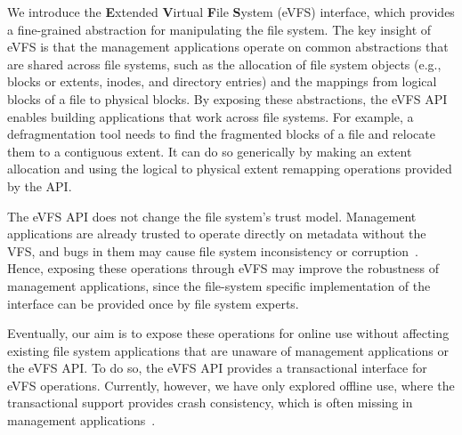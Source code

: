 We introduce the \textbf{E}xtended \textbf{V}irtual \textbf{F}ile \textbf{S}ystem (eVFS) interface, which provides a fine-grained abstraction for manipulating the file system. The key insight of eVFS is that the management applications operate on common abstractions that are shared across file systems, such as the allocation of file system objects (e.g., blocks or extents, inodes, and directory entries) and the mappings from logical blocks of a file to physical blocks. By exposing these abstractions, the eVFS API enables building applications that work across file systems. For example, a defragmentation tool needs to find the fragmented blocks of a file and relocate them to a contiguous extent. It can do so generically by making an extent allocation and using the logical to physical extent remapping operations provided by the API.

The eVFS API does not change the file system's trust model. Management applications are already trusted to operate directly on metadata without the VFS, and bugs in them may cause file system inconsistency or corruption~\cite{Carreira2012,Gunawi08b}. Hence, exposing these operations through eVFS may improve the robustness of management applications, since the file-system specific implementation of the interface can be provided once by file system experts.

Eventually, our aim is to expose these operations for online use without affecting existing file system applications that are unaware of management applications or the eVFS API. To do so, the eVFS API provides a transactional interface for eVFS operations. Currently, however, we have only explored offline use, where the transactional support provides crash consistency, which is often missing in management applications~\cite{gatla2018fsck}.


